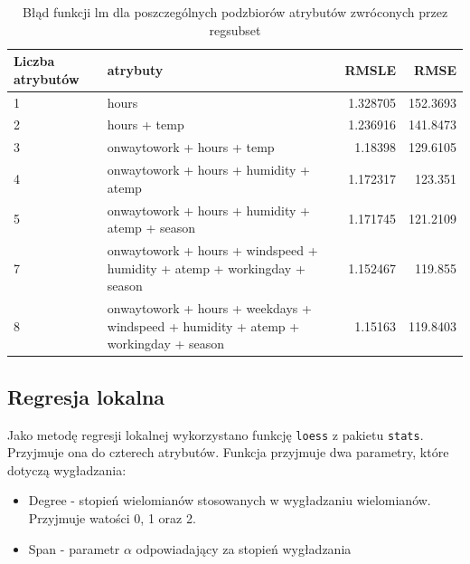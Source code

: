 \documentclass[a4paper,12pt]{article}
\begin{document}
        \begin{table}[h]
        	\centering
            \begin{tabular}{|p{2cm}|p{8cm}|r|r|}
                \hline
                Liczba atrybutów & atrybuty & RMSLE & RMSE \\
                \hline
                1 & 
                hours
                & 
                1.328705
                & 
                152.3693
                \\
                \hline
                2 & 
                hours + temp
                & 
                1.236916
                & 
                141.8473
                \\
                \hline
                3 & 
                onwaytowork + hours + temp
                & 
                1.18398
                & 
                129.6105
                \\
                \hline
                4 & 
                onwaytowork + hours + humidity + atemp
                & 
                1.172317
                & 
                123.351
                \\
                \hline
                5 &  onwaytowork + hours + humidity + atemp + season
                & 
                1.171745
                & 
                121.2109
                \\
                \hline
                7 & onwaytowork + hours + windspeed + humidity + atemp + workingday + season & 
                1.152467
                & 
                119.855
                \\
                \hline
                8 & 
                onwaytowork + hours + weekdays + windspeed + humidity + atemp + workingday + season 
                & 
                1.15163
                & 
                119.8403
                \\
                \hline
            \end{tabular}
            \caption{Błąd funkcji lm dla poszczególnych podzbiorów atrybutów zwróconych przez regsubset}
            \label{tab:linModels}
        \end{table}
        
        
    \subsection{Regresja lokalna}
        Jako metodę regresji lokalnej wykorzystano funkcję \texttt{loess} z pakietu \texttt{stats}. Przyjmuje ona do czterech atrybutów. Funkcja przyjmuje dwa parametry, które dotyczą wygładzania:
        \begin{itemize}
            \item
                Degree - stopień wielomianów stosowanych w wygładzaniu wielomianów. Przyjmuje watości 0, 1 oraz 2.
            \item
                Span - parametr $\alpha$ odpowiadający za stopień wygładzania
        \end{itemize}
        
\end{document}
